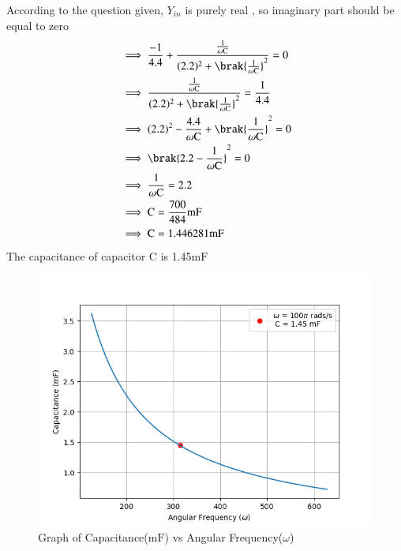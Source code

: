 \documentclass[a4,12pt,onecolumn]{IEEEtran}
\begin{document}
According to the question given, $Y_{in}$ is purely real , so imaginary part should be equal to zero\\
\begin{align}
&\implies  \frac{-1}{4.4}+\frac{\frac{1}{\omega\text{C}}}{(2.2)^2+\brak{\frac{1}{\omega\text{C}}}^2} = 0\\
&\implies  \frac{\frac{1}{\omega\text{C}}}{(2.2)^2+\brak{\frac{1}{\omega\text{C}}}^2}=\frac{1}{4.4}\\
&\implies  (2.2)^2-\frac{4.4}{\omega\text{C}}+\brak{\frac{1}{\omega\text{C}}}^2=0\\
&\implies  \brak{2.2-\frac{1}{\omega\text{C}}}^2=0\\
&\implies  \frac{1}{\omega\text{C}}=2.2\\
&\implies  \text{C}=\frac{700}{484}\text{mF}\\
&\implies  \text{C}=1.446281\text{mF}
\end{align}
The capacitance of capacitor $\text{C}$ is 1.45$\text{mF}$
\begin{figure}[ht!]
\includegraphics[width=\columnwidth]{fig/fig3.png}
\caption{Graph of Capacitance($\text{mF}$) vs Angular Frequency($\omega$)}
\end{figure}
\end{document}
